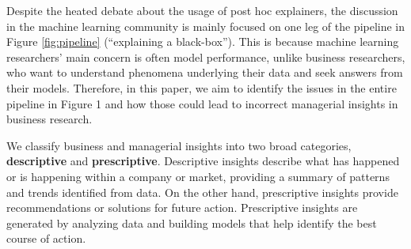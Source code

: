 \documentclass[11pt]{article}    %
\begin{document}
Despite the heated debate about the usage of post hoc explainers, the discussion in the machine learning community is mainly focused on one leg of the pipeline in Figure \ref{fig:pipeline}  (``explaining a black-box''). This is because machine learning researchers' main concern is often model performance, unlike business researchers, who want to understand phenomena underlying their data and seek answers from their models. Therefore, in this paper, we aim to identify the issues in the entire pipeline in Figure 1 and how those could lead to incorrect managerial insights in business research.  

We classify business and managerial insights into two broad categories, \textbf{descriptive} and \textbf{prescriptive}. Descriptive insights describe what has happened or is happening within a company or market, providing a summary of patterns and trends identified from data. On the other hand, prescriptive insights provide recommendations or solutions for future action. Prescriptive insights are generated by analyzing data and building models that help identify the best course of action.
\end{document}
